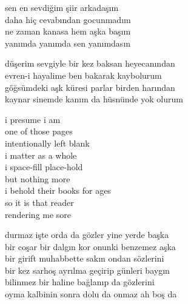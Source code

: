 \documentclass[10pt, openright, oneside]{memoir}
\theoremstyle{definition}
\begin{document}
\settowidth{\versewidth}{sen en sevdiğim şiir arkadaşım}
\begin{cverse}
  sen en sevdiğim şiir arkadaşım \\
  daha hiç cevabından gocunmadım \\
  ne zaman kanasa hem aşka başım \\
  yanımda yanımda sen yanımdasın \\
\end{cverse}
\vspace*{\fill}
%
\newpage
{}
\vspace*{\fill}
\settowidth{\versewidth}{düşerim sevgiyle bir kez baksan heyecanından}
\begin{cverse}
  düşerim sevgiyle bir kez baksan heyecanından \\
  evren-i hayalime ben bakarak kaybolurum \\
  göğsümdeki aşk küresi parlar birden harından \\
  kaynar sinemde kanım da hüsnünde yok olurum \\
\end{cverse}
\vspace*{\fill}
%
\newpage
{}
\vspace*{\fill}
\settowidth{\versewidth}{i behold their books for ages}
\begin{cverse}
  i presume i am \\
  one of those pages \\
  intentionally left blank \\
  i matter as a whole \\
  i space-fill place-hold \\
  but nothing more \\
  i behold their books for ages \\
  so it is that reader \\
  rendering me sore \\
\end{cverse}
\vspace*{\fill}
%
\newpage
{}
\vspace*{\fill}
\settowidth{\versewidth}{bir coşar bir dalgın kor onunki benzemez aşka}
\begin{cverse}
  durmaz işte orda da gözler yine yerde başka \\
  bir coşar bir dalgın kor onunki benzemez aşka \\
  bir girift muhabbette sakın ondan sözlerini \\
  bir kez sarhoş ayrılma geçirip günleri baygın \\
  bilinmez bir haline bağlanıp da gözlerini \\
  oyma kalbinin sonra dolu da onmaz ah boş da \\
\end{cverse}
\end{document}
